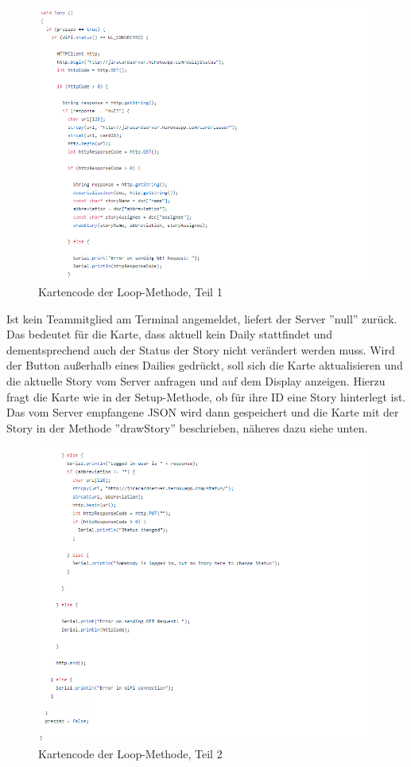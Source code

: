 \documentclass[12pt,titlepage]{scrartcl}
\begin{document}
		\begin{figure}[H] 
  				\centering
    			\includegraphics[height=0.7\textheight]{storyLoop1}
  				\caption{Kartencode der Loop-Methode, Teil 1}
  				\label{fig:storyLoop1}
			\end{figure}
			\noindent Ist kein Teammitglied am Terminal angemeldet, liefert der Server ''null'' zurück. Das bedeutet für die Karte, dass aktuell kein Daily stattfindet und dementsprechend auch der Status der Story nicht verändert werden muss. Wird der Button außerhalb eines Dailies gedrückt, soll sich die Karte aktualisieren und die aktuelle Story vom Server anfragen und auf dem Display anzeigen. Hierzu fragt die Karte wie in der Setup-Methode, ob für ihre ID eine Story hinterlegt ist. Das vom Server empfangene JSON wird dann gespeichert und die Karte mit der Story in der Methode ''drawStory'' beschrieben, näheres dazu siehe unten. \\
			 \begin{figure}[H] 
  				\centering
    			\includegraphics[height=0.7\textheight]{storyLoop2}
  				\caption{Kartencode der Loop-Methode, Teil 2}
  				\label{fig:storyLoop2}
			\end{figure}
\end{document}
